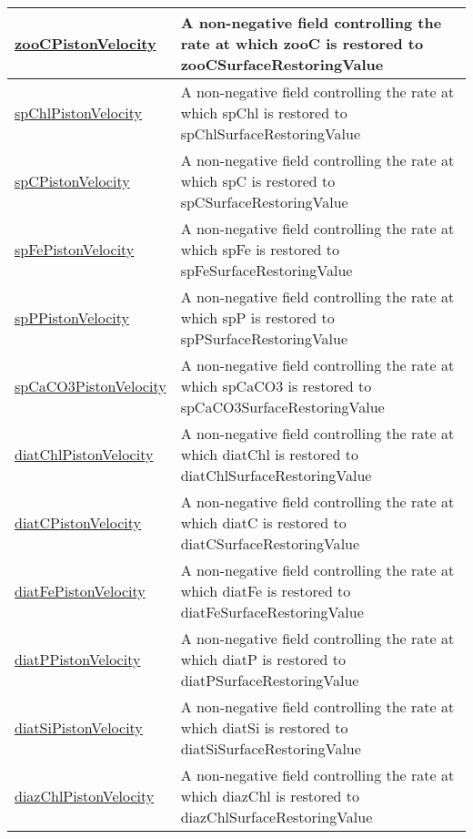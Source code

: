 {\begin{center}
\begin{longtable}{| p{2.0in} | p{4.0in} |}
    \hline
    \hyperref[subsec:var_sec_forcing_zooCPistonVelocity]{zooCPistonVelocity} & A non-negative field controlling the rate at which zooC is restored to zooCSurfaceRestoringValue \\
    \hline
    \hyperref[subsec:var_sec_forcing_spChlPistonVelocity]{spChlPistonVelocity} & A non-negative field controlling the rate at which spChl is restored to spChlSurfaceRestoringValue \\
    \hline
    \hyperref[subsec:var_sec_forcing_spCPistonVelocity]{spCPistonVelocity} & A non-negative field controlling the rate at which spC is restored to spCSurfaceRestoringValue \\
    \hline
    \hyperref[subsec:var_sec_forcing_spFePistonVelocity]{spFePistonVelocity} & A non-negative field controlling the rate at which spFe is restored to spFeSurfaceRestoringValue \\
    \hline
    \hyperref[subsec:var_sec_forcing_spPPistonVelocity]{spPPistonVelocity} & A non-negative field controlling the rate at which spP is restored to spPSurfaceRestoringValue \\
    \hline
    \hyperref[subsec:var_sec_forcing_spCaCO3PistonVelocity]{spCaCO3PistonVelocity} & A non-negative field controlling the rate at which spCaCO3 is restored to spCaCO3SurfaceRestoringValue \\
    \hline
    \hyperref[subsec:var_sec_forcing_diatChlPistonVelocity]{diatChlPistonVelocity} & A non-negative field controlling the rate at which diatChl is restored to diatChlSurfaceRestoringValue \\
    \hline
    \hyperref[subsec:var_sec_forcing_diatCPistonVelocity]{diatCPistonVelocity} & A non-negative field controlling the rate at which diatC is restored to diatCSurfaceRestoringValue \\
    \hline
    \hyperref[subsec:var_sec_forcing_diatFePistonVelocity]{diatFePistonVelocity} & A non-negative field controlling the rate at which diatFe is restored to diatFeSurfaceRestoringValue \\
    \hline
    \hyperref[subsec:var_sec_forcing_diatPPistonVelocity]{diatPPistonVelocity} & A non-negative field controlling the rate at which diatP is restored to diatPSurfaceRestoringValue \\
    \hline
    \hyperref[subsec:var_sec_forcing_diatSiPistonVelocity]{diatSiPistonVelocity} & A non-negative field controlling the rate at which diatSi is restored to diatSiSurfaceRestoringValue \\
    \hline
    \hyperref[subsec:var_sec_forcing_diazChlPistonVelocity]{diazChlPistonVelocity} & A non-negative field controlling the rate at which diazChl is restored to diazChlSurfaceRestoringValue \\

\end{longtable}
\end{center}}
